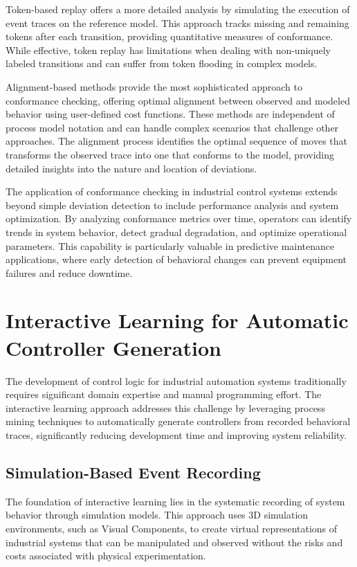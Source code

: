 Token-based replay offers a more detailed analysis by simulating the execution of event traces on the reference model. This approach tracks missing and remaining tokens after each transition, providing quantitative measures of conformance. While effective, token replay has limitations when dealing with non-uniquely labeled transitions and can suffer from token flooding in complex models.


Alignment-based methods provide the most sophisticated approach to conformance checking, offering optimal alignment between observed and modeled behavior using user-defined cost functions. These methods are independent of process model notation and can handle complex scenarios that challenge other approaches. The alignment process identifies the optimal sequence of moves that transforms the observed trace into one that conforms to the model, providing detailed insights into the nature and location of deviations.

The application of conformance checking in industrial control systems extends beyond simple deviation detection to include performance analysis and system optimization. By analyzing conformance metrics over time, operators can identify trends in system behavior, detect gradual degradation, and optimize operational parameters. This capability is particularly valuable in predictive maintenance applications, where early detection of behavioral changes can prevent equipment failures and reduce downtime.

\section{Interactive Learning for Automatic Controller Generation}

The development of control logic for industrial automation systems traditionally requires significant domain expertise and manual programming effort. The interactive learning approach addresses this challenge by leveraging process mining techniques to automatically generate controllers from recorded behavioral traces, significantly reducing development time and improving system reliability.

\subsection{Simulation-Based Event Recording}

The foundation of interactive learning lies in the systematic recording of system behavior through simulation models. This approach uses 3D simulation environments, such as Visual Components, to create virtual representations of industrial systems that can be manipulated and observed without the risks and costs associated with physical experimentation.

